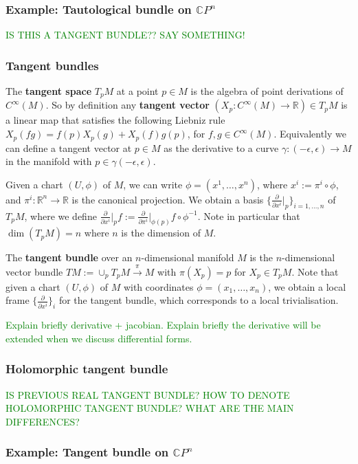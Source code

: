 \documentclass[a4paper]{article}
\theoremstyle{definition} \newtheorem*{definition}{Definition}
\theoremstyle{definition} \newtheorem*{definitions}{Definitions}
\theoremstyle{plain} \newtheorem{theorem}{Theorem}[section]
\theoremstyle{plain} \newtheorem{proposition}[theorem]{Proposition}
\theoremstyle{plain} \newtheorem{corollary}[theorem]{Corollary}
\theoremstyle{plain} \newtheorem{lemma}[theorem]{Lemma}
\theoremstyle{plain} \newtheorem{example}[theorem]{Example}
\newcommand{\finish}[1]{\textcolor{green}{#1}}
\newcommand{\defn}[1]{\textbf{#1}}
\newcommand{\realnos}{\mathbb{R}}
\newcommand{\complexnos}{\mathbb{C}}
\begin{document}
\subsubsection{Example: Tautological bundle on $\complexnos P^n$ }
\finish{IS THIS A TANGENT BUNDLE?? SAY SOMETHING!}


\subsubsection{Tangent bundles}

The \defn{tangent space} $T_p M$ at a point $p\in M$ is the algebra of point derivations of $C^\infty (M)$. So by definition any \defn{tangent vector} $(X_p:C^\infty (M)\to \realnos) \in T_p M$ is a linear map that satisfies the following Liebniz rule $X_p(fg)=f(p)X_p(g) + X_p(f)g(p)$, for $f,g\in C^\infty (M)$. Equivalently we can define a tangent vector at $p\in M$ as the derivative to a curve $\gamma: (-\epsilon, \epsilon)\to M$ in the manifold with $p\in \gamma (-\epsilon, \epsilon)$. 

Given a chart $(U, \phi)$ of $M$, we can write $\phi = (x^1, \ldots, x^n)$, where $x^i := \pi^i\circ \phi$, and $\pi^i:\realnos^n \to \realnos$ is the canonical projection. We obtain a basis $\{\frac{\partial}{\partial{x^i}} \vert_p\}_{i=1,\ldots, n}$ 
of $T_p M$, where we define $\frac{\partial}{\partial{x^i}} \vert_p f := \frac{\partial}{\partial{\pi^i}}\vert_{\phi (p)} f\circ \phi^{-1}$. Note in particular that 
$\dim (T_p M) = n$ where 
$n$ is the dimension of $M$.

The \defn{tangent bundle} over an $n$-dimensional manifold $M$ is the $n$-dimensional vector bundle $TM:=\cup_p T_p M\xrightarrow{\pi} M$ with $\pi(X_p)=p$ for $X_p\in T_p M$. Note that given a chart $(U, \phi)$ of $M$ with coordinates $\phi =(x_1, \ldots, x_n)$, we obtain a local frame $\{\frac{\partial}{\partial{x^i}}\}_i$ for the tangent bundle, which corresponds to a local trivialisation. 

\finish{Explain briefly derivative + jacobian. Explain briefly the derivative will be extended when we discuss differential forms.}

\subsubsection{Holomorphic tangent bundle}
\finish{IS PREVIOUS REAL TANGENT BUNDLE? HOW TO DENOTE HOLOMORPHIC TANGENT BUNDLE? WHAT ARE THE MAIN DIFFERENCES?}

\subsubsection{Example: Tangent bundle on $\complexnos P^n$}
\end{document}
